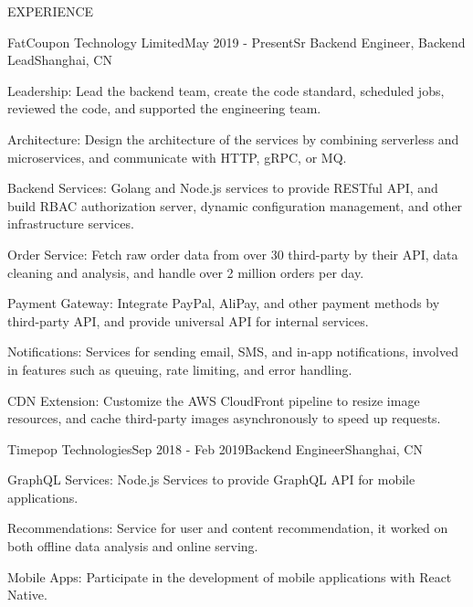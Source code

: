 \documentclass{resume} %
\begin{document}
\begin{rSection}{EXPERIENCE}

  \begin{rSubsection}{FatCoupon Technology Limited}{May 2019 - Present}{Sr Backend Engineer, Backend Lead}{Shanghai, CN}
    \item Leadership: Lead the backend team, create the code standard, scheduled jobs, reviewed the code, and supported the engineering team.
    \item Architecture: Design the architecture of the services by combining serverless and microservices, and communicate with HTTP, gRPC, or MQ.
    \item Backend Services: Golang and Node.js services to provide RESTful API, and build RBAC authorization server, dynamic configuration management, and other infrastructure services.
    \item Order Service: Fetch raw order data from over 30 third-party by their API, data cleaning and analysis, and handle over 2 million orders per day.
    \item Payment Gateway: Integrate PayPal, AliPay, and other payment methods by third-party API, and provide universal API for internal services.
    \item Notifications: Services for sending email, SMS, and in-app notifications, involved in features such as queuing, rate limiting, and error handling.
    \item CDN Extension: Customize the AWS CloudFront pipeline to resize image resources, and cache third-party images asynchronously to speed up requests.
  \end{rSubsection}

  \begin{rSubsection}{Timepop Technologies}{Sep 2018 - Feb 2019}{Backend Engineer}{Shanghai, CN}
    \item GraphQL Services: Node.js Services to provide GraphQL API for mobile applications.
    \item Recommendations: Service for user and content recommendation, it worked on both offline data analysis and online serving.
    \item Mobile Apps: Participate in the development of mobile applications with React Native.
  \end{rSubsection}


\end{rSection}
\end{document}
